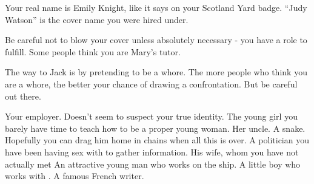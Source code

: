 \documentclass[char]{airship}
\begin{document}
\begin{itemz}[Notes]
  \item Your real name is Emily Knight, like it says on your Scotland Yard badge. ``Judy Watson'' is the cover name you were hired under.
  \item Be careful not to blow your cover unless absolutely necessary - you have a role to fulfill. Some people think you are Mary's tutor.
  \item The way to Jack is by pretending to be a whore. The more people who think you are a whore, the better your chance of drawing a confrontation. But be careful out there.
\end{itemz}


\begin{contacts}
  \contact{\cCaptain{}} Your employer. Doesn't seem to suspect your true identity.
  \contact{\cThief{}} The young girl you barely have time to teach how to be a proper young woman.
  \contact{\cVicar{}} Her uncle.
  \contact{\cBoddy{}} A snake. Hopefully you can drag him home in chains when all this is over.
  \contact{\cNoble{}} A politician you have been having sex with to gather information.
  \contact{\cJack{}} His wife, whom you have not actually met
  \contact{\cCid{}} An attractive young man who works on the ship.
  \contact{\cRobot{}} A little boy who works with \cCid{}.
  \contact{\cSaboteur{}} A famous French writer.
\end{contacts}


\endtag
\end{document}
